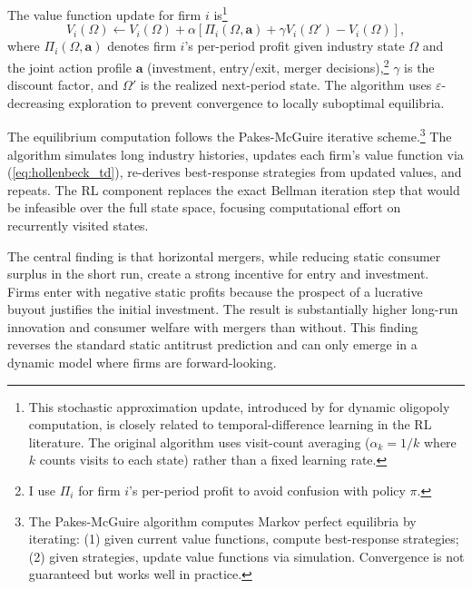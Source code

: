 The value function update for firm $i$ is\footnote{This stochastic approximation update, introduced by \citet{PakesMcGuire1994} for dynamic oligopoly computation, is closely related to temporal-difference learning in the RL literature. The original algorithm uses visit-count averaging ($\alpha_k = 1/k$ where $k$ counts visits to each state) rather than a fixed learning rate.}
\begin{equation}
V_i(\Omega) \leftarrow V_i(\Omega) + \alpha\left[\Pi_i(\Omega, \mathbf{a}) + \gamma V_i(\Omega') - V_i(\Omega)\right], \label{eq:hollenbeck_td}
\end{equation}
where $\Pi_i(\Omega, \mathbf{a})$ denotes firm $i$'s per-period profit given industry state $\Omega$ and the joint action profile $\mathbf{a}$ (investment, entry/exit, merger decisions),\footnote{I use $\Pi_i$ for firm $i$'s per-period profit to avoid confusion with policy $\pi$.} $\gamma$ is the discount factor, and $\Omega'$ is the realized next-period state. The algorithm uses $\varepsilon$-decreasing exploration to prevent convergence to locally suboptimal equilibria.

The equilibrium computation follows the Pakes-McGuire iterative scheme.\footnote{The Pakes-McGuire algorithm \citep{PakesMcGuire1994} computes Markov perfect equilibria by iterating: (1) given current value functions, compute best-response strategies; (2) given strategies, update value functions via simulation. Convergence is not guaranteed but works well in practice.} The algorithm simulates long industry histories, updates each firm's value function via (\ref{eq:hollenbeck_td}), re-derives best-response strategies from updated values, and repeats. The RL component replaces the exact Bellman iteration step that would be infeasible over the full state space, focusing computational effort on recurrently visited states.

The central finding is that horizontal mergers, while reducing static consumer surplus in the short run, create a strong incentive for entry and investment. Firms enter with negative static profits because the prospect of a lucrative buyout justifies the initial investment. The result is substantially higher long-run innovation and consumer welfare with mergers than without. This finding reverses the standard static antitrust prediction and can only emerge in a dynamic model where firms are forward-looking.

